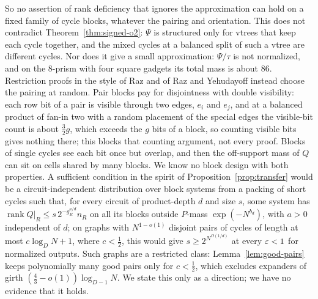 So no assertion of rank deficiency that ignores the approximation can hold on a fixed family of cycle blocks, whatever the pairing and orientation. This does not contradict Theorem~\ref{thm:signed-o2}: $\Psi$ is structured only for vtrees that keep each cycle together, and the mixed cycles at a balanced split of such a vtree are different cycles. Nor does it give a small approximation: $\Psi/\tau$ is not normalized, and on the $8$-prism with four square gadgets its total mass is about $86$. Restriction proofs in the style of Raz and of Raz and Yehudayoff instead choose the pairing at random. Pair blocks pay for disjointness with double visibility: each row bit of a pair is visible through two edges, $e_i$ and $e_j$, and at a balanced product of fan-in two with a random placement of the special edges the visible-bit count is about $\frac32g$, which exceeds the $g$ bits of a block, so counting visible bits gives nothing there; this blocks that counting argument, not every proof. Blocks of single cycles see each bit once but overlap, and then the off-support mass of $Q$ can sit on cells shared by many blocks. We know no block design with both properties. A sufficient condition in the spirit of Proposition~\ref{prop:transfer} would be a circuit-independent distribution over block systems from a packing of short cycles such that, for every circuit of product-depth $d$ and size $s$, some system has $\operatorname{rank}Q|_R\le s\,2^{-g_R^{a/d}}n_R$ on all its blocks outside $P$-mass $\exp(-N^{b_d})$, with $a>0$ independent of $d$; on graphs with $N^{1-o(1)}$ disjoint pairs of cycles of length at most $c\log_DN+1$, where $c<\frac12$, this would give $s\ge2^{N^{\Omega(1/d)}}$ at every $\varepsilon<1$ for normalized outputs. Such graphs are a restricted class: Lemma~\ref{lem:good-pairs} keeps polynomially many good pairs only for $c<\frac12$, which excludes expanders of girth $(\frac43-o(1))\log_{D-1}N$. We state this only as a direction; we have no evidence that it holds.
